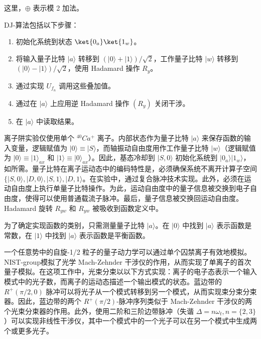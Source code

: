 这里，$\oplus$ 表示模 2 加法。

DJ-算法包括以下步骤：

\begin{enumerate}
    \item 初始化系统到状态 $\ket{0_a} \ket{1_w}$。
    \item 将输入量子比特 $|a\rangle$ 转移到 $(|0\rangle + |1\rangle)/\sqrt{2}$，工作量子比特 $|w\rangle$ 转移到 $(|0\rangle - |1\rangle)/\sqrt{2}$，使用 Hadamard 操作 $R_y$。
    \item 通过实现 $U_{f_n}$ 调用这些叠加值。
    \item 通过在 $|a\rangle$ 上应用逆 Hadamard 操作 $(R_y)$ 关闭干涉。
    \item 在 $|a\rangle$ 中读取结果。
\end{enumerate}

离子阱实验仅使用单个 $^{40} Ca^{+}$ 离子。内部状态作为量子比特 $|a\rangle$ 来保存函数的输入变量，逻辑赋值为 $|0\rangle \equiv |S\rangle$，而轴振动自由度用作工作量子比特 $|w\rangle$（逻辑赋值为 $|0\rangle \equiv |1\rangle_{ax}$ 和 $|1\rangle \equiv |0\rangle_{ax}$）。因此，基态冷却到 $|S, 0\rangle$ 初始化系统到 $|0_a\rangle|1_w\rangle$，如所需。量子比特在离子运动态中的编码特性是，必须确保系统不离开计算子空间 $\{|S, 0\rangle, |D, 0\rangle, |S, 1\rangle, |D, 1\rangle$。在实验中，通过复合脉冲技术实现。此外，必须在运动自由度上执行单量子比特操作。为此，运动自由度中的量子信息被交换到电子自由度，使得可以使用普通载流子脉冲。最后，量子信息被交换回运动自由度。Hadamard 旋转 $R_{yw}$ 和 $R_{yw}$ 被吸收到函数定义中。

为了确定实现函数的类别，只需测量量子比特 $|a\rangle$。在 $|0\rangle$ 中找到 $|a\rangle$ 表示函数是常数，在 $|1\rangle$ 中找到 $|a\rangle$ 表示函数是平衡函数。



一个任意势中的自旋-1/2 粒子的量子动力学可以通过单个囚禁离子有效地模拟。 NIST-group模拟了光学 Mach-Zehnder 干涉仪的作用，从而实现了单离子的首次量子模拟。在这项工作中，光束分束以以下方式实现：离子的电子态表示一个输入模式中的光子数，而离子的运动态描述一个输出模式的状态。蓝边带的 $R^+(\pi/2, 0)$ 脉冲可以将光子从一个模式转移到另一个模式，从而实现束分束分束器。因此，蓝边带的两个 $R^+(\pi/2)$-脉冲序列类似于 Mach-Zehnder 干涉仪的两个光束分束器的作用。此外，使用二阶和三阶边带脉冲（失谐 $\Delta = n\omega_t, n = \{2, 3\}$）可以实现非线性干涉仪，其中一个模式中的一个光子可以在另一个模式中生成两个或更多光子。


